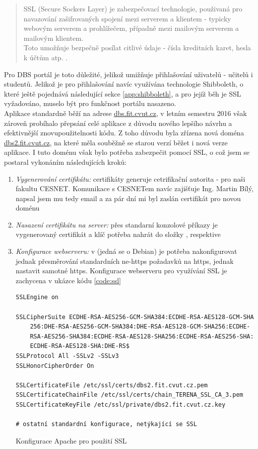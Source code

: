 \begin{quote}
SSL (Secure Sockers Layer) je zabezpečovací technologie, použivaná pro navazování zašifrovaných spojení mezi serverem a klientem - typicky webovým serverem a prohlížečem, případně mezi mailovým serverem a mailovým klientem.\\
Toto umožňuje bezpečně posílat citlivé údaje - čísla kreditních karet, hesla k účtům atp. \cite{ssl}.
\end{quote}
Pro DBS portál je toto důležité, jelikož umižňuje přihlašování uživatelů - učitelů i studentů. Jelikož je pro přihlašování navíc využívána technologie Shibboleth, o které ještě pojednává následující sekce \ref{app:shibboleth}, a pro jejíž běh je SSL vyžadováno, muselo být pro funkčnost portálu nasazeno.\\
Aplikace standardně běží na adrese \url{dbs.fit.cvut.cz}, v letním semestru 2016 však zároveň probíhalo přepsání celé aplikace z důvodu nového lepšího návrhu a efektivnější znovupoužitelnosti kódu. Z toho důvodu byla zřízena nová doména \url{dbs2.fit.cvut.cz}, na které měla souběžně se starou verzí běžet i nová verze aplikace. I tuto doménu však bylo potřeba zabezpečit pomocí SSL, o což jsem se postaral vykonáním následujících kroků:
\begin{enumerate}
	\item \emph{Vygenerování certifikátu:} certifikáty generuje cetrifikační autorita - pro naši fakultu CESNET. Komunikace s CESNETem navíc zajišťuje Ing. Martin Bílý, napsal jsem mu tedy email a za pár dní mi byl zaslán certifikát pro novou doménu
	\item \emph{Nasazení certifikátu na server:} přes standarní konzolové příkazy je vygenerovaný certifikát a klíč potřeba nahrát do složky , respektive 
	\item \emph{Konfigurace webserveru:} v  (jedná se o Debian) je potřeba nakonfigurovat jednak přesměrování standardních ne-https požadavků na https, jednak nastavit samotné https. Konfigurace  webserveru pro využívání SSL je zachycena v ukázce kódu \ref{code:ssl}
	\begin{listing}
		\expandafter\def\csname PY@tok@err\endcsname{} %
		\begin{verbatim}
SSLEngine on

SSLCipherSuite ECDHE-RSA-AES256-GCM-SHA384:ECDHE-RSA-AES128-GCM-SHA
    256:DHE-RSA-AES256-GCM-SHA384:DHE-RSA-AES128-GCM-SHA256:ECDHE-
    RSA-AES256-SHA384:ECDHE-RSA-AES128-SHA256:ECDHE-RSA-AES256-SHA:
    ECDHE-RSA-AES128-SHA:DHE-RS$
SSLProtocol All -SSLv2 -SSLv3
SSLHonorCipherOrder On

SSLCertificateFile /etc/ssl/certs/dbs2.fit.cvut.cz.pem
SSLCertificateChainFile /etc/ssl/certs/chain_TERENA_SSL_CA_3.pem
SSLCertificateKeyFile /etc/ssl/private/dbs2.fit.cvut.cz.key

# ostatní standardní konfigurace, netýkající se SSL
		\end{verbatim}
		\caption{Konfigurace Apache pro použití SSL} \label{code:ssl}
	\end{listing}
\end{enumerate}

